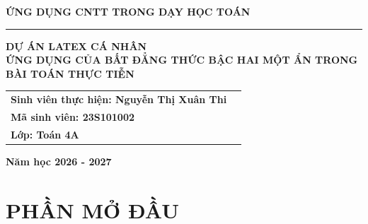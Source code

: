 \documentclass[14pt, a4paper, oneside]{extreport}
\begin{document}
\begin{titlepage}
    \begin{center}
        \vspace*{1cm}
        
  
        \textbf{\large ỨNG DỤNG CNTT TRONG DẠY HỌC TOÁN} \\
        \vspace{0.5cm}
        \rule{0.6\textwidth}{0.5pt} %
        
        \vspace{2.5cm}
        
        
        \vspace{2cm}
        
        \textbf{\LARGE DỰ ÁN LATEX CÁ NHÂN} \\
        \vspace{0.5cm}
        \textbf{\huge ỨNG DỤNG CỦA BẤT ĐẲNG THỨC BẬC HAI MỘT ẨN TRONG BÀI TOÁN THỰC TIỄN} \\
        
        \vspace{3cm}
        
       
            \begin{tabular}{ll}
               
                \textbf{Sinh viên thực hiện: Nguyễn Thị Xuân Thi} \\
                \textbf{Mã sinh viên: 23S101002} \\
                \textbf{Lớp: Toán 4A} \\
            \end{tabular}
      
        
        \vfill %
        
        \textbf{Năm học 2026 - 2027}
        
    \end{center}
\end{titlepage}

\newpage

\section*{\centering PHẦN MỞ ĐẦU}
\end{document}
